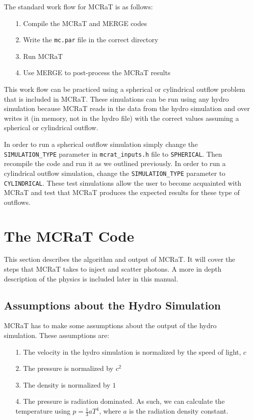 \documentclass[12pt,a4paper]{article}
\begin{document}
 \noindent The standard work flow for MCRaT is as follows:
 \begin{itemize}
 \item[1.] Compile the MCRaT and MERGE codes
 \item[2.] Write the \texttt{mc.par} file in the correct directory
 \item[3.] Run MCRaT
 \item[4.] Use MERGE to post-process the MCRaT results
 \end{itemize}
 
 This work flow can be practiced using a spherical or cylindrical outflow problem that is included in MCRaT. These simulations can be run using any hydro simulation because MCRaT reads in the data from the hydro simulation and over writes it (in memory, not in the hydro file) with the correct values assuming a spherical or cylindrical outflow.
 
 In order to run a spherical outflow simulation simply change the \texttt{SIMULATION\_TYPE} parameter in \texttt{mcrat\_inputs.h} file to \texttt{SPHERICAL}. Then recompile the code and run it as we outlined previously. In order to run a cylindrical outflow simulation, change the \texttt{SIMULATION\_TYPE} parameter to \texttt{CYLINDRICAL}. These test simulations allow the user to become acquainted with MCRaT and test that MCRaT produces the expected results for these type of outflows.
 

\section{The MCRaT Code}
This section describes the algorithm and output of MCRaT. It will cover the steps that MCRaT takes to inject and scatter photons. A more in depth description of the physics is included later in this manual.

\subsection{Assumptions about the Hydro Simulation}
MCRaT has to make some assumptions about the output of the hydro simulation. These assumptions are:
\begin{itemize}
\item[1.] The velocity in the hydro simulation is normalized by the speed of light, $c$ 
\item[2.] The pressure is normalized by $c^2$
\item[3.] The density is normalized by $1$
\item[4.] The pressure is radiation dominated. As such, we can calculate the temperature using $p=\frac{1}{3}aT^4$, where $a$ is the radiation density constant.
\end{itemize}
\end{document}
